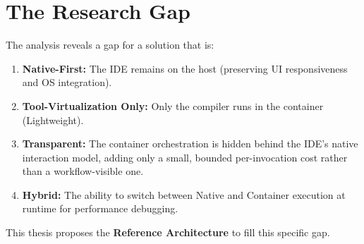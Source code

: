 \section{The Research Gap}
The analysis reveals a gap for a solution that is:
\begin{enumerate}
    \item \textbf{Native-First:} The IDE remains on the host (preserving UI responsiveness and OS integration).
    \item \textbf{Tool-Virtualization Only:} Only the compiler runs in the container (Lightweight).
    \item \textbf{Transparent:} The container orchestration is hidden behind the IDE's native interaction model, adding only a small, bounded per-invocation cost rather than a workflow-visible one.
    \item \textbf{Hybrid:} The ability to switch between Native and Container execution at runtime for performance debugging.
\end{enumerate}
This thesis proposes the \textbf{Reference Architecture} to fill this specific gap.
